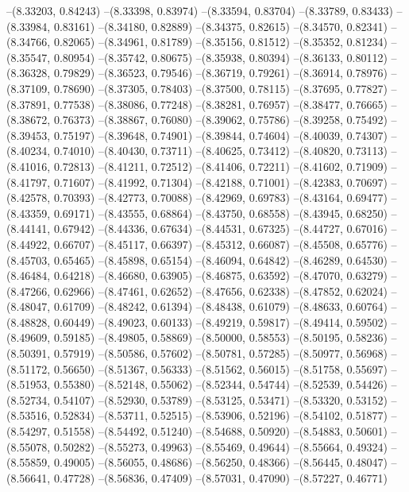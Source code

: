 --(8.33203, 0.84243)
--(8.33398, 0.83974)
--(8.33594, 0.83704)
--(8.33789, 0.83433)
--(8.33984, 0.83161)
--(8.34180, 0.82889)
--(8.34375, 0.82615)
--(8.34570, 0.82341)
--(8.34766, 0.82065)
--(8.34961, 0.81789)
--(8.35156, 0.81512)
--(8.35352, 0.81234)
--(8.35547, 0.80954)
--(8.35742, 0.80675)
--(8.35938, 0.80394)
--(8.36133, 0.80112)
--(8.36328, 0.79829)
--(8.36523, 0.79546)
--(8.36719, 0.79261)
--(8.36914, 0.78976)
--(8.37109, 0.78690)
--(8.37305, 0.78403)
--(8.37500, 0.78115)
--(8.37695, 0.77827)
--(8.37891, 0.77538)
--(8.38086, 0.77248)
--(8.38281, 0.76957)
--(8.38477, 0.76665)
--(8.38672, 0.76373)
--(8.38867, 0.76080)
--(8.39062, 0.75786)
--(8.39258, 0.75492)
--(8.39453, 0.75197)
--(8.39648, 0.74901)
--(8.39844, 0.74604)
--(8.40039, 0.74307)
--(8.40234, 0.74010)
--(8.40430, 0.73711)
--(8.40625, 0.73412)
--(8.40820, 0.73113)
--(8.41016, 0.72813)
--(8.41211, 0.72512)
--(8.41406, 0.72211)
--(8.41602, 0.71909)
--(8.41797, 0.71607)
--(8.41992, 0.71304)
--(8.42188, 0.71001)
--(8.42383, 0.70697)
--(8.42578, 0.70393)
--(8.42773, 0.70088)
--(8.42969, 0.69783)
--(8.43164, 0.69477)
--(8.43359, 0.69171)
--(8.43555, 0.68864)
--(8.43750, 0.68558)
--(8.43945, 0.68250)
--(8.44141, 0.67942)
--(8.44336, 0.67634)
--(8.44531, 0.67325)
--(8.44727, 0.67016)
--(8.44922, 0.66707)
--(8.45117, 0.66397)
--(8.45312, 0.66087)
--(8.45508, 0.65776)
--(8.45703, 0.65465)
--(8.45898, 0.65154)
--(8.46094, 0.64842)
--(8.46289, 0.64530)
--(8.46484, 0.64218)
--(8.46680, 0.63905)
--(8.46875, 0.63592)
--(8.47070, 0.63279)
--(8.47266, 0.62966)
--(8.47461, 0.62652)
--(8.47656, 0.62338)
--(8.47852, 0.62024)
--(8.48047, 0.61709)
--(8.48242, 0.61394)
--(8.48438, 0.61079)
--(8.48633, 0.60764)
--(8.48828, 0.60449)
--(8.49023, 0.60133)
--(8.49219, 0.59817)
--(8.49414, 0.59502)
--(8.49609, 0.59185)
--(8.49805, 0.58869)
--(8.50000, 0.58553)
--(8.50195, 0.58236)
--(8.50391, 0.57919)
--(8.50586, 0.57602)
--(8.50781, 0.57285)
--(8.50977, 0.56968)
--(8.51172, 0.56650)
--(8.51367, 0.56333)
--(8.51562, 0.56015)
--(8.51758, 0.55697)
--(8.51953, 0.55380)
--(8.52148, 0.55062)
--(8.52344, 0.54744)
--(8.52539, 0.54426)
--(8.52734, 0.54107)
--(8.52930, 0.53789)
--(8.53125, 0.53471)
--(8.53320, 0.53152)
--(8.53516, 0.52834)
--(8.53711, 0.52515)
--(8.53906, 0.52196)
--(8.54102, 0.51877)
--(8.54297, 0.51558)
--(8.54492, 0.51240)
--(8.54688, 0.50920)
--(8.54883, 0.50601)
--(8.55078, 0.50282)
--(8.55273, 0.49963)
--(8.55469, 0.49644)
--(8.55664, 0.49324)
--(8.55859, 0.49005)
--(8.56055, 0.48686)
--(8.56250, 0.48366)
--(8.56445, 0.48047)
--(8.56641, 0.47728)
--(8.56836, 0.47409)
--(8.57031, 0.47090)
--(8.57227, 0.46771)
